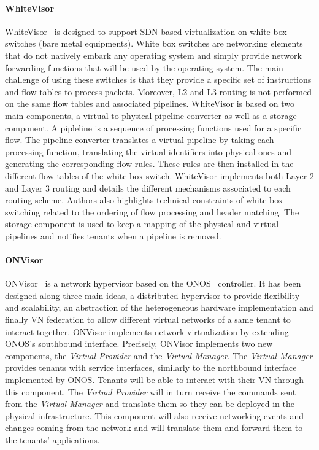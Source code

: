 \paragraph{WhiteVisor}
WhiteVisor~\cite{whitevisor-Yu2019} is designed to support SDN-based virtualization on white box switches (\ie bare metal equipments).
White box switches are networking elements that do not natively embark any operating system and simply provide network forwarding functions that will be used by the operating system.  
The main challenge of using these switches is that they provide a specific set of instructions and flow tables to process packets. 
Moreover, L2 and L3 routing is not performed on the same flow tables and associated pipelines.
WhiteVisor is based on two main components, a virtual to physical pipeline converter as well as a storage component.
A pipleline is a sequence of processing functions used for a specific flow.
The pipeline converter translates a virtual pipeline by taking each processing function, translating the virtual identifiers into physical ones and generating the corresponding flow rules. These rules are then installed in the different flow tables of the white box switch. WhiteVisor implements both Layer 2 and Layer 3 routing and details the different mechanisms associated to each routing scheme. Authors also highlights technical constraints of white box switching related to the ordering of flow processing and header matching. The storage component is used to keep a mapping of the physical and virtual pipelines and notifies tenants when a pipeline is removed. 


\paragraph{ONVisor}
ONVisor~\cite{ONVisor-Han2018} is a network hypervisor based on the ONOS~\cite{onos-Berde2014a} controller.
It has been designed along three main ideas, a distributed hypervisor to provide flexibility and scalability, an abstraction of the heterogeneous hardware implementation and finally VN federation to allow different virtual networks of a same tenant to interact together.
ONVisor implements network virtualization by extending ONOS's southbound interface.
Precisely, ONVisor implements two new components, the \textit{Virtual Provider} and the \textit{Virtual Manager}.
The \textit{Virtual Manager} provides tenants with service interfaces, similarly to the northbound interface implemented by ONOS. Tenants will be able to interact with their VN through this component.
The \textit{Virtual Provider} will in turn receive the commands sent from the \textit{Virtual Manager} and translate them so they can be deployed in the physical infrastructure. This component will also receive networking events and changes coming from the network and will translate them and forward them to the tenants' applications.

